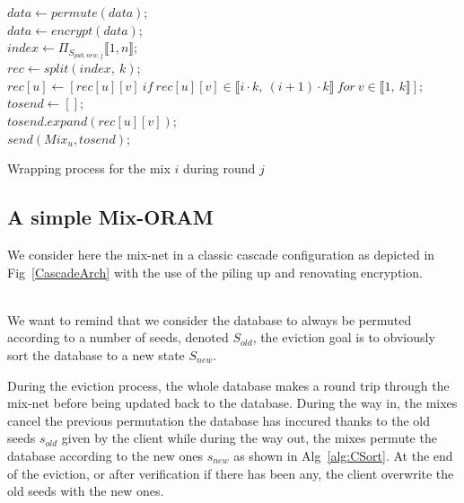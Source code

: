 \documentclass[USenglish,oneside,twocolumn]{article}
\begin{document}
\begin{algorithm}
\DontPrintSemicolon
{}
$data \gets permute(data)$;\\
$data \gets encrypt(data)$;\\

$index \gets {\Pi}_{S_{pub,new,j}} \llbracket 1,n \rrbracket$;\\
$rec \gets split(index,\ k)$;\\
{
	$rec[u] \gets [rec[u][v]\ if\ rec[u][v] \in \llbracket i\cdot k,\ (i+1) \cdot k \rrbracket\ for\  v \in \llbracket 1,\ k \rrbracket]$;\\
}
{
	$tosend \gets []$;\\
	{
		$tosend.expand(rec[u][v])$;\\
	}
	$send(Mix_u, tosend)$;\\
}
\caption{Wrapping process for the mix $i$ during round $j$}
\label{alg:WAS}
\end{algorithm}
%
\subsection{A simple Mix-ORAM}\label{SMO}
%
We consider here the mix-net in a classic cascade configuration as depicted in Fig~\ref{CascadeArch} with the use of the piling up and renovating encryption.\\\

We want to remind that we consider the database to always be permuted according to a number of seeds, denoted $S_{old}$, the eviction goal is to obviously sort the database to a new state $S_{new}$.

During the eviction process, the whole database makes a round trip through the mix-net before being updated back to the database. During the way in, the mixes cancel the previous permutation the database has inccured thanks to the old seeds $s_{old}$ given by the client while during the way out, the mixes permute the database according to the new ones $s_{new}$ as shown in Alg~\ref{alg:CSort}. At the end of the eviction, or after verification if there has been any, the client overwrite the old seeds with the new ones.\\
\end{document}
